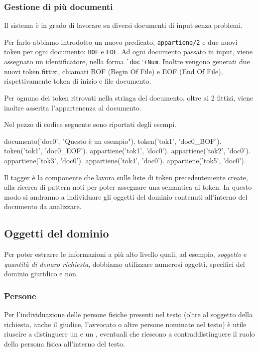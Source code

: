 \subsubsection{Gestione di più documenti}
Il sistema è in grado di lavorare su diversi documenti di input senza problemi.

Per farlo abbiamo introdotto un nuovo predicato, \verb+appartiene/2+ e due nuovi token per ogni documento: \verb+BOF+ e \verb+EOF+.
Ad ogni documento passato in input, viene assegnato un identificatore, nella forma \verb:`doc'+Num:. Inoltre vengono generati due nuovi token fittizi, chiamati BOF (Begin Of File) e EOF (End Of File), rispettivamente token di inizio e file documento.

Per ognuno dei token ritrovati nella stringa del documento, oltre ai 2 fittizi, viene inoltre asserita l'appartenenza al documento.

Nel pezzo di codice seguente sono riportati degli esempi.

\begin{prologcode}
documento('doc0', "Questo è un esempio").
token('tok1', 'doc0_BOF').
token('tok1', 'doc0_EOF').
appartiene('tok1', 'doc0').
appartiene('tok2', 'doc0').
appartiene('tok3', 'doc0').
appartiene('tok4', 'doc0').
appartiene('tok5', 'doc0').
\end{prologcode}





Il tagger è la componente che lavora sulle liste di token precedentemente create, alla ricerca di pattern noti per poter assegnare una semantica ai token. In questo modo si andranno a individuare gli oggetti del dominio contenuti all'interno del documento da analizzare.

\subsection{Oggetti del dominio}
Per poter estrarre le informazioni a più alto livello quali, ad esempio, \emph{soggetto} e \emph{quantità di denaro richiesta}, dobbiamo utilizzare numerosi oggetti, specifici del dominio giuridico e non.

\subsubsection{Persone}
Per l'individuazione delle persone fisiche presenti nel testo (oltre al soggetto della richiesta, anche il giudice, l'avvocato o altre persone nominate nel testo) è utile riuscire a distinguere un  e un , eventuali  che riescono a contraddistinguere il ruolo della persona fisica all'interno del testo.

